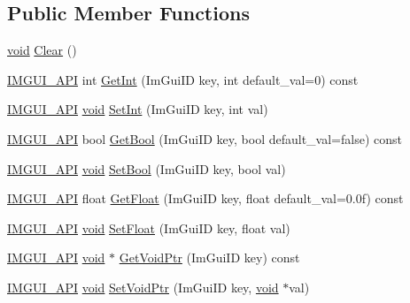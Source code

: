 \subsection*{Public Member Functions}
\begin{DoxyCompactItemize}
\item 
\hyperlink{imgui__impl__opengl3__loader_8h_ac668e7cffd9e2e9cfee428b9b2f34fa7}{void} \hyperlink{structImGuiStorage_a72ceecfbca3d08df8c2a232b77890c20}{Clear} ()
\item 
\hyperlink{imgui_8h_a43829975e84e45d1149597467a14bbf5}{I\+M\+G\+U\+I\+\_\+\+A\+PI} int \hyperlink{structImGuiStorage_ac86b64f5c69a15de6c6c326963eca64a}{Get\+Int} (Im\+Gui\+ID key, int default\+\_\+val=0) const
\item 
\hyperlink{imgui_8h_a43829975e84e45d1149597467a14bbf5}{I\+M\+G\+U\+I\+\_\+\+A\+PI} \hyperlink{imgui__impl__opengl3__loader_8h_ac668e7cffd9e2e9cfee428b9b2f34fa7}{void} \hyperlink{structImGuiStorage_af83975ca841a9bd0e06a6ea0a41bf159}{Set\+Int} (Im\+Gui\+ID key, int val)
\item 
\hyperlink{imgui_8h_a43829975e84e45d1149597467a14bbf5}{I\+M\+G\+U\+I\+\_\+\+A\+PI} bool \hyperlink{structImGuiStorage_a22d34ae6278f86468a3e7df8fbd1b632}{Get\+Bool} (Im\+Gui\+ID key, bool default\+\_\+val=false) const
\item 
\hyperlink{imgui_8h_a43829975e84e45d1149597467a14bbf5}{I\+M\+G\+U\+I\+\_\+\+A\+PI} \hyperlink{imgui__impl__opengl3__loader_8h_ac668e7cffd9e2e9cfee428b9b2f34fa7}{void} \hyperlink{structImGuiStorage_ac5beee31a59b3f5294b41992717be7bf}{Set\+Bool} (Im\+Gui\+ID key, bool val)
\item 
\hyperlink{imgui_8h_a43829975e84e45d1149597467a14bbf5}{I\+M\+G\+U\+I\+\_\+\+A\+PI} float \hyperlink{structImGuiStorage_a0f51ef327f7e548d003b0e006967c1eb}{Get\+Float} (Im\+Gui\+ID key, float default\+\_\+val=0.\+0f) const
\item 
\hyperlink{imgui_8h_a43829975e84e45d1149597467a14bbf5}{I\+M\+G\+U\+I\+\_\+\+A\+PI} \hyperlink{imgui__impl__opengl3__loader_8h_ac668e7cffd9e2e9cfee428b9b2f34fa7}{void} \hyperlink{structImGuiStorage_ab531d90a0e5a1a2453e351c499149756}{Set\+Float} (Im\+Gui\+ID key, float val)
\item 
\hyperlink{imgui_8h_a43829975e84e45d1149597467a14bbf5}{I\+M\+G\+U\+I\+\_\+\+A\+PI} \hyperlink{imgui__impl__opengl3__loader_8h_ac668e7cffd9e2e9cfee428b9b2f34fa7}{void} $\ast$ \hyperlink{structImGuiStorage_aaf87a98ede89da09113b0189f6d878ca}{Get\+Void\+Ptr} (Im\+Gui\+ID key) const
\item 
\hyperlink{imgui_8h_a43829975e84e45d1149597467a14bbf5}{I\+M\+G\+U\+I\+\_\+\+A\+PI} \hyperlink{imgui__impl__opengl3__loader_8h_ac668e7cffd9e2e9cfee428b9b2f34fa7}{void} \hyperlink{structImGuiStorage_a55f840086b3ec9cf63c67f02d159204a}{Set\+Void\+Ptr} (Im\+Gui\+ID key, \hyperlink{imgui__impl__opengl3__loader_8h_ac668e7cffd9e2e9cfee428b9b2f34fa7}{void} $\ast$val)

\end{DoxyCompactItemize}
